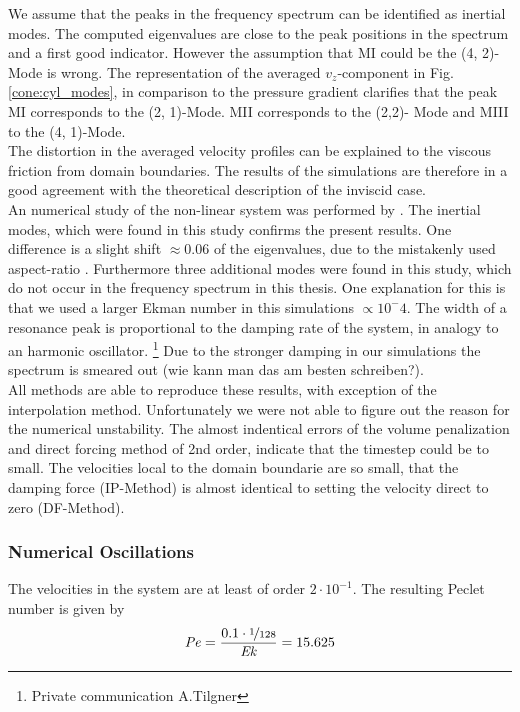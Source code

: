 We assume that the peaks in the frequency spectrum can be identified as inertial modes.
The computed eigenvalues  are close to the peak positions in the spectrum and a first good indicator.
However  the assumption that M\RN{1} could be the (4, 2)-Mode is wrong.
The representation of the averaged $v_z$-component in Fig. \ref{cone:cyl_modes}, in comparison to the pressure gradient
clarifies that the peak M\RN{1} corresponds to the (2, 1)-Mode.
M\RN{2} corresponds to the (2,2)- Mode and M\RN{3}  to the (4, 1)-Mode.\\
The distortion in the averaged velocity profiles can be explained to the viscous friction from domain boundaries.
The results of the simulations are therefore in a good agreement with the theoretical description of the inviscid case.
\\
An numerical study of the non-linear system was performed by \citep{Sauret2012}.
The inertial modes, which were found in this study confirms the present results.
One difference is a slight shift $\approx0.06$ of the eigenvalues,
due to the mistakenly used aspect-ratio .
Furthermore three additional modes were found in this study, which do not occur
in the frequency spectrum in this thesis.
One explanation for this is that we used a  larger Ekman number in this simulations $\propto10^-4$.
The width of a resonance peak is proportional to the damping rate of the system, in analogy to an harmonic oscillator.
\footnote{Private communication A.Tilgner}
Due to the stronger damping in our simulations the spectrum is smeared out (wie kann man das am besten schreiben?).\\
All methods are able to reproduce these results, with exception of the interpolation method.
Unfortunately we were not able to figure out the reason for the numerical unstability.
The almost indentical errors of the volume penalization and direct forcing method of 2nd order,
indicate that the timestep could be to small.
The velocities local to the domain boundarie are so small, that the damping force (IP-Method) is almost identical
to setting the velocity direct to zero (DF-Method).

\subsubsection{Numerical Oscillations}

The velocities in the system are at least of order $2\cdot10^{-1}$. The resulting Peclet number is
given by
\begin{align}
    \mbox{\textit{Pe}} = \frac{0.1\cdot\nicefrac{1}{128}}{\mbox{\textit{Ek}}} =15.625
\end{align}

